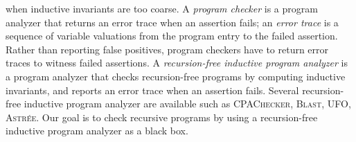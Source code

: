 when inductive invariants are too coarse. 
A \emph{program checker} is
a program analyzer that returns an error trace when an assertion
fails; an \emph{error trace} is a sequence of variable valuations from
the program entry to the failed assertion. Rather than reporting false
positives, program checkers have to return error traces to witness 
failed assertions. %
A \emph{recursion-free
  inductive program analyzer} is a program analyzer that checks
recursion-free programs by computing inductive invariants, and reports
an error trace when an assertion fails. Several recursion-free
inductive program analyzer are available such as \textsc{CPAChecker},
\textsc{Blast}, \textsc{UFO}, \textsc{Astr\'ee}. Our goal is to check
recursive programs by using a recursion-free inductive program analyzer
as a black box.
